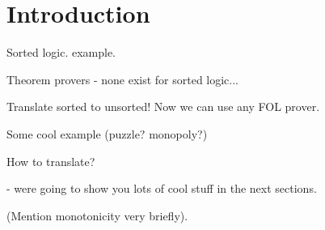 \section{Introduction}

Sorted logic. example.

Theorem provers - none exist for sorted logic...

Translate sorted to unsorted! Now we can use any FOL prover.

Some cool example (puzzle? monopoly?)

How to translate?

- were going to show you lots of cool stuff in the next sections.

(Mention monotonicity very briefly).












